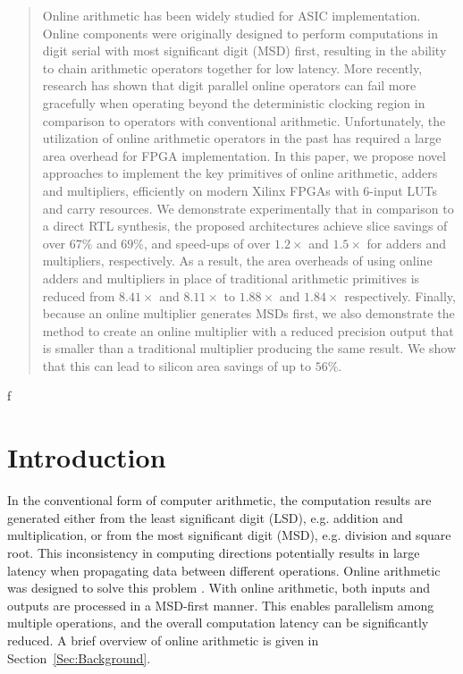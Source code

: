 \documentclass[conference]{IEEEtran}
\begin{document}
\begin{abstract}
Online arithmetic has been widely studied for ASIC implementation. Online components were originally designed to perform computations in digit serial with most significant digit (MSD) first, resulting in the ability to chain arithmetic operators together for low latency. More recently, research has shown that digit parallel online operators can fail more gracefully when operating beyond the deterministic clocking region in comparison to operators with conventional arithmetic. Unfortunately, the utilization of online arithmetic operators in the past has required a large area overhead for FPGA implementation. In this paper, we propose novel approaches to implement the key primitives of online arithmetic, adders and multipliers, efficiently on modern Xilinx FPGAs with 6-input LUTs and carry resources. We demonstrate experimentally that in comparison to a direct RTL synthesis, the proposed architectures achieve slice savings of over $67\%$ and $69\%$, and speed-ups of over $1.2\times$ and $1.5\times$ for adders and multipliers, respectively. As a result, the area overheads of using online adders and multipliers in place of traditional arithmetic primitives is reduced from $8.41\times$ and $8.11\times$ to $1.88\times$ and $1.84\times$ respectively. Finally, because an online multiplier generates MSDs first, we also demonstrate the method to create an online multiplier with a reduced precision output that is smaller than a traditional multiplier producing the same result. We show that this can lead to silicon area savings of up to $56\%$.\vspace{-0.5ex}




\end{abstract}

f


\section{Introduction}\label{Sec:Intro}\vspace{-0.5ex}
In the conventional form of computer arithmetic, the computation results are generated either from the least significant digit (LSD), e.g. addition and multiplication, or from the most significant digit (MSD), e.g. division and square root. This inconsistency in computing directions potentially results in large latency when propagating data between different operations. Online arithmetic was designed to solve this problem \cite{Ercegovac_OnlineOverview,Ercegovac_Book}. With online arithmetic, both inputs and outputs are processed in a MSD-first manner. This enables parallelism among multiple operations, and the overall computation latency can be significantly reduced. A brief overview of online arithmetic is given in Section~\ref{Sec:Background}.\vspace{-0.5ex}
\end{document}
